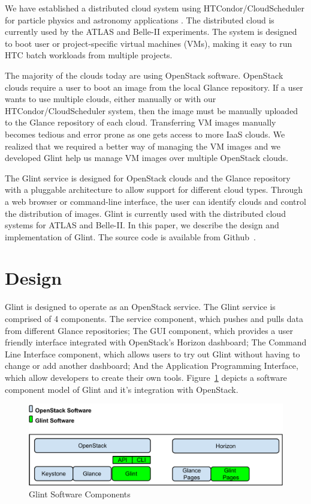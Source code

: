 \documentclass[a4paper]{jpconf}
\begin{document}
We have established a distributed cloud system using HTCondor/CloudScheduler for particle physics and astronomy applications \cite{hpcs:cloudpaper, sobie-nyc-cloud}. The distributed cloud is currently used by the ATLAS \cite{ryan-chep} and Belle-II \cite{sobie-chep} experiments. The system is designed to boot user or project-specific virtual machines (VMs), making it easy to run HTC batch workloads from multiple projects.

The majority of the clouds today are using OpenStack software. OpenStack clouds require a user to boot an image from the local Glance repository. If a user wants to use multiple clouds, either manually or with our HTCondor/CloudScheduler system, then the image must be manually uploaded to the Glance repository of each cloud. Transferring VM images manually becomes tedious and error prone as one gets access to more IaaS clouds. We realized that we required a better way of managing the VM images and we developed Glint help us manage VM images over multiple OpenStack clouds.

The Glint service is designed for OpenStack clouds and the Glance repository with a pluggable architecture to allow support for different cloud types. Through a web browser or command-line interface, the user can identify clouds and control the distribution of images. Glint is currently used with the distributed cloud systems for ATLAS and Belle-II. In this paper, we describe the design and implementation of Glint. The source code is available from Github~\cite{glint}.

\section{Design}
Glint is designed to operate as an OpenStack service. The Glint service is comprised of 4 components. The service component, which pushes and pulls data from different Glance repositories; The GUI component, which provides a user friendly interface integrated with OpenStack's Horizon dashboard; The Command Line Interface component, which allows users to try out Glint without having to change or add another dashboard; And the Application Programming Interface, which allow developers to create their own tools. Figure~\ref{fig:glintfigure_cm} depicts a software component model of Glint and it's integration with OpenStack. 

\begin{figure}[ht]
\begin{center}
\includegraphics[width=36pc]{images/glintdesign.pdf}
\caption{\label{fig:glintfigure_cm}Glint Software Components}
\end{center}
\end{figure}
\end{document}
